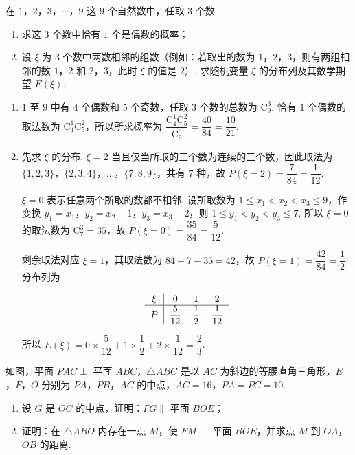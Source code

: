 \begin{problem}
在 \(1\)，\(2\)，\(3\)，\(\cdots\)，\(9\) 这 \(9\) 个自然数中，任取 \(3\) 个数.
\begin{enumerate}
\item 求这 \(3\) 个数中恰有 \(1\) 个是偶数的概率；
\item 设 \(\xi\) 为 \(3\) 个数中两数相邻的组数（例如：若取出的数为 \(1\)，\(2\)，\(3\)，则有两组相邻的数 \(1\)，\(2\) 和 \(2\)，\(3\)，此时 \(\xi\) 的值是 \(2\)）. 求随机变量 \(\xi\) 的分布列及其数学期望 \(E(\xi)\).
\end{enumerate}
\end{problem}

\begin{solution}
\begin{enumerate}
\item \(1\) 至 \(9\) 中有 \(4\) 个偶数和 \(5\) 个奇数，任取 \(3\) 个数的总数为 \(\mathrm C_9^3\). 恰有 \(1\) 个偶数的取法数为 \(\mathrm C_4^1\mathrm C_5^2\)，所以所求概率为
\(\dfrac{\mathrm C_4^1\mathrm C_5^2}{\mathrm C_9^3}=\dfrac{40}{84}=\dfrac{10}{21}\).
\item 先求 \(\xi\) 的分布. \(\xi=2\) 当且仅当所取的三个数为连续的三个数，因此取法为 \(\{1,2,3\}\)，\(\{2,3,4\}\)，\(\ldots\)，\(\{7,8,9\}\)，共有 \(7\) 种，故 \(P(\xi=2)=\dfrac7{84}=\dfrac1{12}\).

\(\xi=0\) 表示任意两个所取的数都不相邻. 设所取数为 \(1\leqslant x_1<x_2<x_3\leqslant9\)，作变换 \(y_1=x_1\)，\(y_2=x_2-1\)，\(y_3=x_3-2\)，则 \(1\leqslant y_1<y_2<y_3\leqslant7\). 所以 \(\xi=0\) 的取法数为 \(\mathrm C_7^3=35\)，故 \(P(\xi=0)=\dfrac{35}{84}=\dfrac5{12}\).

剩余取法对应 \(\xi=1\)，其取法数为 \(84-7-35=42\)，故 \(P(\xi=1)=\dfrac{42}{84}=\dfrac12\). 分布列为

\[
\begin{tabular}{c|ccc}
\(\xi\) & \(0\) & \(1\) & \(2\) \\
\hline
\(P\) & \(\dfrac5{12}\) & \(\dfrac12\) & \(\dfrac1{12}\)
\end{tabular}
\]

所以 \(E(\xi)=0\times\dfrac5{12}+1\times\dfrac12+2\times\dfrac1{12}=\dfrac23\).
\end{enumerate}
\end{solution}

\begin{problem}
如图，平面 \(PAC \perp\) 平面 \(ABC\)，\(\triangle ABC\) 是以 \(AC\) 为斜边的等腰直角三角形，\(E\)，\(F\)，\(O\) 分别为 \(PA\)，\(PB\)，\(AC\) 的中点，\(AC=16\)，\(PA=PC=10\).
\begin{enumerate}
\item 设 \(G\) 是 \(OC\) 的中点，证明：\(FG \parallel\) 平面 \(BOE\)；
\item 证明：在 \(\triangle ABO\) 内存在一点 \(M\)，使 \(FM \perp\) 平面 \(BOE\)，并求点 \(M\) 到 \(OA\)，\(OB\) 的距离.
\end{enumerate}

\end{problem}

